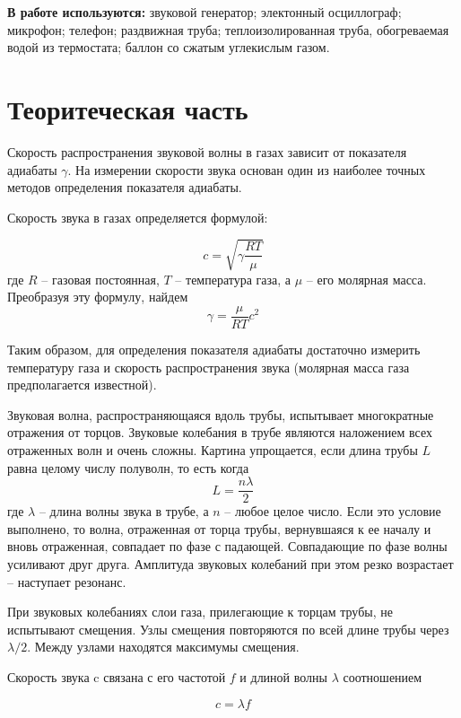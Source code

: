 \documentclass[a4paper,12pt]{article} %
\begin{document}
\textbf{В работе используются:} звуковой генератор; электонный осциллограф; микрофон; телефон; раздвижная труба; теплоизолированная труба, обогреваемая водой из термостата; баллон со сжатым углекислым газом.

\section{Теоритеческая часть}

Скорость распространения звуковой волны в газах зависит от показателя адиабаты $ \gamma $. На измерении скорости звука основан один из наиболее точных методов определения показателя адиабаты.

Скорость звука в газах определяется формулой:

\begin{equation}
\label{velocity}
c=\sqrt{\gamma\frac{RT}{\mu}}
\end{equation}
где $ R $ -- газовая постоянная, $ T $ -- температура газа, а $ \mu $ -- его молярная масса. Преобразуя эту формулу, найдем
\begin{equation}
\label{gamma}
\gamma = \frac{\mu}{RT}c^2
\end{equation}

Таким образом, для определения показателя адиабаты достаточно измерить температуру газа и скорость распространения звука (молярная масса газа предполагается известной).

Звуковая волна, распространяющаяся вдоль трубы, испытывает многократные отражения от торцов. Звуковые колебания в трубе являются наложением всех отраженных волн и очень сложны. Картина упрощается, если длина трубы $ L $ равна целому числу полуволн, то есть когда
\[
L=\frac{n\lambda}{2}
\] где $ \lambda $ -- длина волны звука в трубе, а $ n $ -- любое целое число. Если это условие выполнено, то волна, отраженная от торца трубы, вернувшаяся к ее началу и вновь отраженная, совпадает по фазе с падающей. Совпадающие по фазе волны усиливают друг друга. Амплитуда звуковых колебаний при этом резко возрастает -- наступает резонанс.

При звуковых колебаниях слои газа, прилегающие к торцам трубы, не испытывают смещения. Узлы смещения повторяются по всей длине трубы через $ \lambda/2 $. Между узлами находятся максимумы смещения.

Скорость звука c связана с его частотой $ f $ и длиной волны $ \lambda $ соотношением

\begin{equation}\label{lambda_f}
c=\lambda f
\end{equation}
\end{document}
